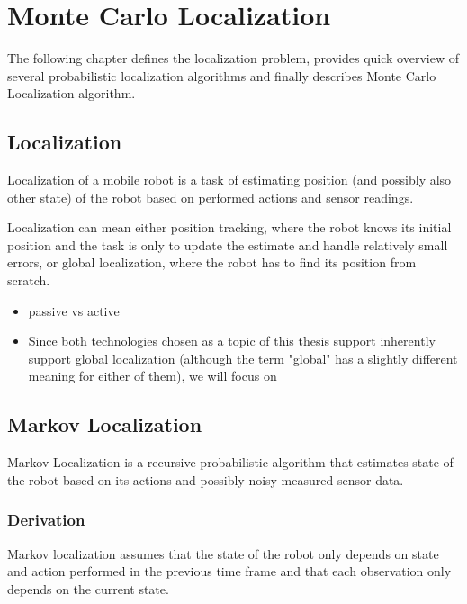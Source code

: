 \chapter{Monte Carlo Localization}
\label{chap:mcl}

The following chapter defines the localization problem, provides quick overview
of several probabilistic localization algorithms and finally describes
Monte Carlo Localization algorithm.

\section{Localization}
Localization of a mobile robot is a task of estimating position (and possibly
also other state) of the robot based on performed actions and sensor readings.

Localization can mean either position tracking, where the robot knows its initial
position and the task is only to update the estimate and handle relatively small
errors, or global localization, where the robot has to find its position from scratch.

\begin{itemize}
\item passive vs active
\item Since both technologies chosen as a topic of this thesis support inherently
	support global localization (although the term "global" has a slightly
	different meaning for either of them), we will focus on 
\end{itemize}

\section{Markov Localization}

Markov Localization \cite{fox98,diard03} is a recursive probabilistic
algorithm that estimates state of the robot based on its
actions and possibly noisy measured sensor data.

\subsection{Derivation}

Markov localization assumes that the state of the robot only depends
on state and action performed in the previous time frame
and that each observation only depends on the current state.

